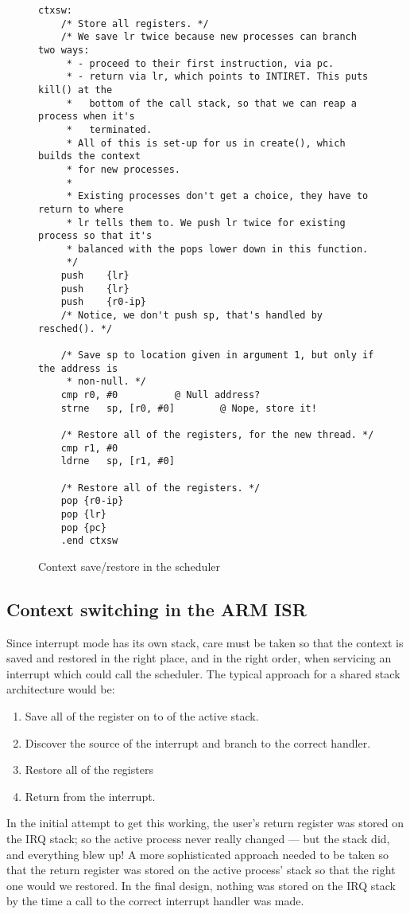\documentclass[12pt]{article}
\begin{document}
\begin{figure}
\caption{Context save/restore in the scheduler}
\label{ctxsw}
\small
\begin{verbatim}
ctxsw:
	/* Store all registers. */
	/* We save lr twice because new processes can branch two ways:
	 * - proceed to their first instruction, via pc.
	 * - return via lr, which points to INTIRET. This puts kill() at the
	 *   bottom of the call stack, so that we can reap a process when it's
	 *   terminated.
	 * All of this is set-up for us in create(), which builds the context
	 * for new processes.
	 *
	 * Existing processes don't get a choice, they have to return to where
	 * lr tells them to. We push lr twice for existing process so that it's
	 * balanced with the pops lower down in this function.
	 */
	push	{lr}
	push	{lr}
	push	{r0-ip}
	/* Notice, we don't push sp, that's handled by resched(). */

	/* Save sp to location given in argument 1, but only if the address is
	 * non-null. */
	cmp	r0, #0			@ Null address?
	strne	sp, [r0, #0]		@ Nope, store it!

	/* Restore all of the registers, for the new thread. */
	cmp	r1, #0
	ldrne	sp, [r1, #0]

	/* Restore all of the registers. */
	pop	{r0-ip}
	pop	{lr}
	pop	{pc}
	.end ctxsw
\end{verbatim}
\end{figure}

\subsection{Context switching in the ARM ISR}

Since interrupt mode has its own stack, care must be taken so that the context
is saved and restored in the right place, and in the right order, when servicing
an interrupt which could call the scheduler. The typical approach for a shared
stack architecture would be:

\begin{enumerate}
\item Save all of the register on to of the active stack.
\item Discover the source of the interrupt and branch to the correct handler.
\item Restore all of the registers
\item Return from the interrupt.
\end{enumerate}

In the initial attempt to get this working, the user's return register was
stored on the IRQ stack; so the active process never really changed \---- but
the stack did, and everything blew up! A more sophisticated approach needed to
be taken so that the return register was stored on the active process' stack so
that the right one would we restored. In the final design, nothing was stored
on the IRQ stack by the time a call to the correct interrupt handler was made.
\end{document}
